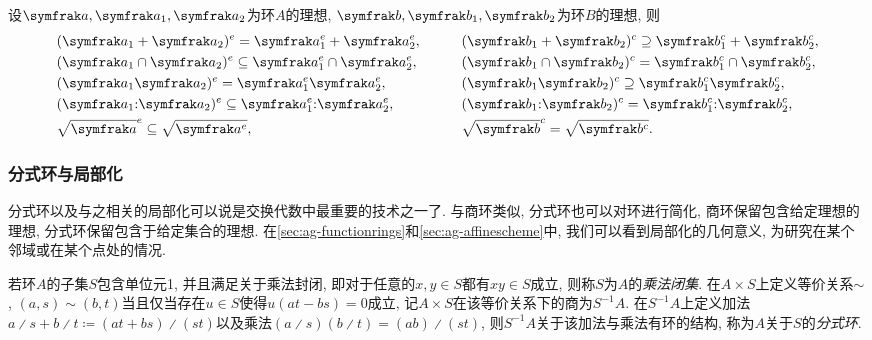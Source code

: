 \begin{proposition}\label{prop:extencontrop}
  设$\ideal{a}, \ideal{a}_1, \ideal{a}_2$为环$A$的理想, $\ideal{b}, \ideal{b}_1, \ideal{b}_2$为环$B$的理想, 则
  \begin{equation*}
    \begin{aligned}
      &(\ideal{a}_1+\ideal{a}_2)^e=\ideal{a}_1^e+\ideal{a}_2^e,
      &&\qquad(\ideal{b}_1+\ideal{b_2})^c\supseteq \ideal{b}_1^c+\ideal{b}_2^c,\\
      &(\ideal{a}_1\cap\ideal{a}_2)^e\subseteq\ideal{a}_1^e\cap\ideal{a}_2^e,
      &&\qquad(\ideal{b}_1\cap\ideal{b_2})^c= \ideal{b}_1^c\cap\ideal{b}_2^c,\\
      &(\ideal{a}_1\ideal{a}_2)^e=\ideal{a}_1^e\ideal{a}_2^e,
      &&\qquad(\ideal{b}_1\ideal{b_2})^c\supseteq\ideal{b}_1^c\ideal{b}_2^c,\\
      &(\ideal{a}_1{:}\ideal{a}_2)^e\subseteq\ideal{a}_1^e{:}\ideal{a}_2^e,
      &&\qquad(\ideal{b}_1{:}\ideal{b_2})^c= \ideal{b}_1^c{:}\ideal{b}_2^c,\\
      &\sqrt{\ideal{a}}^e\subseteq\sqrt{\ideal{a}^e},
      &&\qquad\sqrt{\ideal{b}}^c= \sqrt{\ideal{b}^c}.
    \end{aligned}
  \end{equation*}
\end{proposition}

\subsubsection{分式环与局部化}\label{sec:algebra-localization}

分式环以及与之相关的局部化可以说是交换代数中最重要的技术之一了. 与商环类似, 分式环也可以对环进行简化, 商环保留包含给定理想的理想, 分式环保留包含于给定集合的理想. 在\ref{sec:ag-functionrings}和\ref{sec:ag-affinescheme}中, 我们可以看到局部化的几何意义, 为研究在某个邻域或在某个点处的情况.

\begin{definition}
  若环$A$的子集$S$包含单位元1, 并且满足关于乘法封闭, 即对于任意的$x, y\in S$都有$xy\in S$成立, 则称$S$为$A$的\emph{乘法闭集}. 在$A\times S$上定义等价关系${\sim}$, $(a, s)\sim (b, t)$当且仅当存在$u\in S$使得$u(at-bs)=0$成立, 记$A\times S$在该等价关系下的商为$S^{-1}A$. 在$S^{-1}A$上定义加法$a{\divslash} s+b{\divslash}t \coloneq  (at+bs){\divslash}(st)$以及乘法$(a{\divslash}s)(b{\divslash}t)=(ab){\divslash}(st)$, 则$S^{-1}A$关于该加法与乘法有环的结构, 称为$A$关于$S$的\emph{分式环}.
\end{definition}

